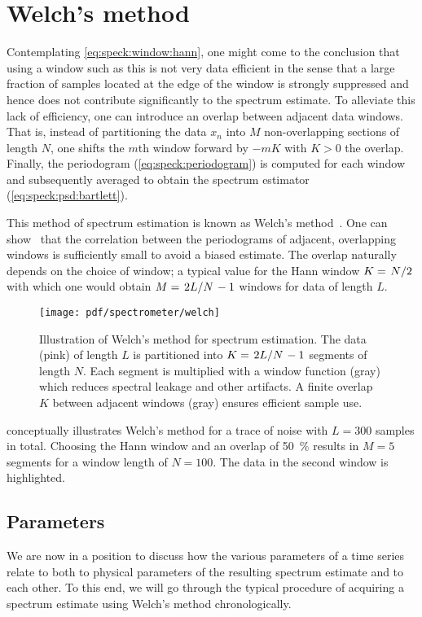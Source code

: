 \section{Welch's method}\label{sec:speck:theory:welch}
Contemplating \cref{eq:speck:window:hann}, one might come to the conclusion that using a window such as this is not very data efficient in the sense that a large fraction of samples located at the edge of the window is strongly suppressed and hence does not contribute significantly to the spectrum estimate.
To alleviate this lack of efficiency, one can introduce an overlap between adjacent data windows.
That is, instead of partitioning the data $x_n$ into $M$ non-overlapping sections of length $N$, one shifts the $m$th window forward by $-mK$ with $K>0$ the overlap.
Finally, the periodogram (\cref{eq:speck:periodogram}) is computed for each window and subsequently averaged to obtain the spectrum estimator (\cref{eq:speck:psd:bartlett}).

This method of spectrum estimation is known as Welch's method~\cite{Welch1967}.
One can show~\cite{Welch1967} that the correlation between the periodograms of adjacent, overlapping windows is sufficiently small to avoid a biased estimate.
The overlap naturally depends on the choice of window; a typical value for the Hann window $K = \flatfrac{N}{2}$ with which one would obtain $M = \flatfrac{2L}{N} - 1$ windows for data of length $L$.
\begin{figure}[tphb]
    \centering
    \texttt{[image: pdf/spectrometer/welch]}
    \caption{
        Illustration of Welch's method for spectrum estimation.
        The data (pink) of length $L$ is partitioned into $K = \flatfrac{2L}{N} - 1$ segments of length $N$.
        Each segment is multiplied with a window function (gray) which reduces spectral leakage and other artifacts.
        A finite overlap $K$ between adjacent windows (gray) ensures efficient sample use.
    }
    \label{fig:speck:welch}
\end{figure}

 conceptually illustrates Welch's method for a trace of \oneoverf noise with $L = 300$ samples in total.
Choosing the Hann window and an overlap of \qty{50}{\percent} results in $M=5$ segments for a window length of $N=100$.
The data in the second window is highlighted.

\subsection{Parameters}\label{subsec:speck:theory:welch:parameters}
We are now in a position to discuss how the various parameters of a time series relate to both to physical parameters of the resulting spectrum estimate and to each other.
To this end, we will go through the typical procedure of acquiring a spectrum estimate using Welch's method chronologically.

